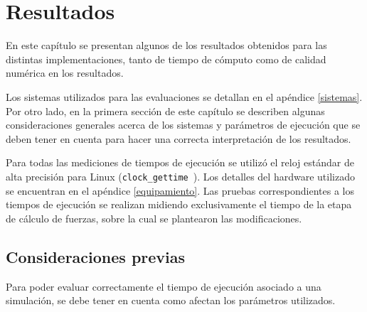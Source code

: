 \chapter{Resultados}
En este capítulo se presentan algunos de los resultados obtenidos para las distintas implementaciones, tanto de tiempo de cómputo como de calidad numérica en los resultados.


Los sistemas utilizados para las evaluaciones se detallan en el apéndice \ref{sistemas}. 
Por otro lado, en la primera sección de este capítulo se describen algunas consideraciones generales acerca de los sistemas y parámetros de ejecución que se deben tener en cuenta para hacer una correcta interpretación de los resultados.

Para todas las mediciones de tiempos de ejecuci\'on se utilizó el reloj est\'andar de alta precisi\'on para Linux (\texttt{clock\_gettime}~\cite{LinuxDocumentation}). 
Los detalles del hardware utilizado se encuentran en el apéndice \ref{equipamiento}. 
Las pruebas correspondientes a los tiempos de ejecución se realizan midiendo exclusivamente el tiempo de la etapa de cálculo de fuerzas, sobre la cual se plantearon las modificaciones.


% 
% 
% 

\section{Consideraciones previas}
Para poder evaluar correctamente el tiempo de ejecución asociado a una simulación, se debe tener en cuenta como afectan los parámetros utilizados.

